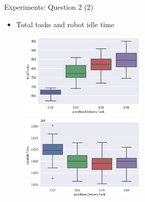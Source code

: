 \begin{frame}{Experiments: Question 2 (2)}
    \begin{itemize}
        \item Total tasks and robot idle time
    \end{itemize}

    \begin{figure}[!hbt]
        \begin{adjustbox}{center}
            \includegraphics[width=6cm]{img/question2-plot3}
            \includegraphics[width=6cm]{img/question2-plot1}
        \end{adjustbox}
    \end{figure}
\end{frame}

